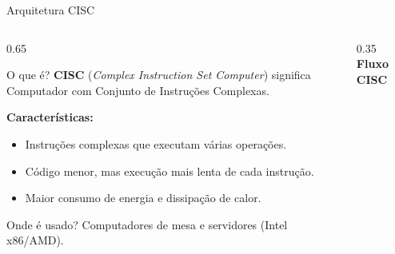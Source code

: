 \documentclass[aspectratio=169]{beamer}
\begin{document}
\begin{frame}{Arquitetura CISC}
    \begin{columns}[T]
        \begin{column}{0.65\textwidth}
            \begin{block}{O que é?}
                \textbf{CISC} (\textit{Complex Instruction Set Computer}) significa Computador com Conjunto de Instruções Complexas.
            \end{block}
            \vspace{0.4em}
            \textbf{Características:}
            \begin{itemize}
                \item Instruções complexas que executam várias operações.
                \item Código menor, mas execução mais lenta de cada instrução.
                \item Maior consumo de energia e dissipação de calor.
            \end{itemize}
            \vspace{0.4em}
            \begin{exampleblock}{Onde é usado?}
                Computadores de mesa e servidores (Intel x86/AMD).
            \end{exampleblock}
        \end{column}
        \begin{column}{0.35\textwidth}
            \centering
            \textbf{Fluxo CISC}
            \vspace{0.5em}
            
        \end{column}
    \end{columns}
\end{frame}
\end{document}
